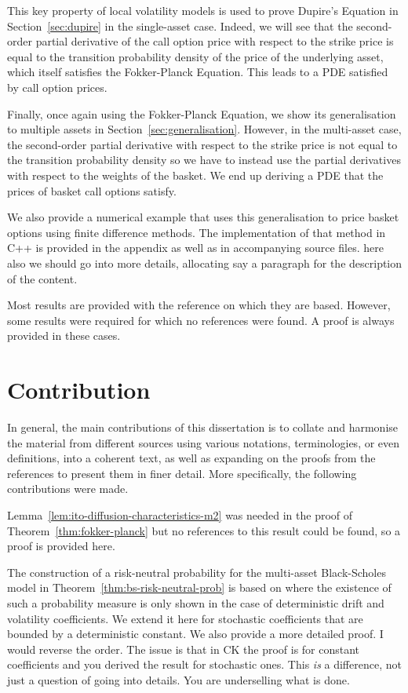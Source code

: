 \documentclass[english]{article}
\newcommand{\comment}[1]{\color{blue}#1\color{black}}
\numberwithin{equation}{section}
\numberwithin{figure}{section}
\theoremstyle{bolddescit}
\theoremstyle{definition}
\theoremstyle{definition}
\theoremstyle{plain}
\theoremstyle{plain}
\theoremstyle{bolddesc}
\theoremstyle{plain}
\theoremstyle{remark}
\begin{document}
This key property of local volatility models is used to prove Dupire's Equation in Section~\ref{sec:dupire} in the single-asset case. Indeed, we will see that the second-order partial derivative of the call option price with respect to the strike price is equal to the transition probability density of the price of the underlying asset, which itself satisfies the Fokker-Planck Equation. This leads to a PDE satisfied by call option prices.

Finally, once again using the Fokker-Planck Equation, we show its generalisation to multiple assets in Section~\ref{sec:generalisation}. However, in the multi-asset case, the second-order partial derivative with respect to the strike price is not equal to the transition probability density so we have to instead use the partial derivatives with respect to the weights of the basket. We end up deriving a PDE that the prices of basket call options satisfy.

We also provide a numerical example that uses this generalisation to price basket options using finite difference methods.  The implementation of that method in C++ is provided in the appendix as well as in accompanying source files.
\comment{here also we should go into more details, allocating say a paragraph for the description of the content.}

Most results are provided with the reference on which they are based. However, some results were required for which no references were found. A proof is always provided in these cases.

\section{Contribution}

In general, the main contributions of this dissertation is to collate and harmonise the material from different sources using various notations, terminologies, or even definitions, into a coherent text, as well as expanding on the proofs from the references to present them in finer detail. More specifically, the following contributions were made.

Lemma~\ref{lem:ito-diffusion-characteristics-m2} was needed in the proof of Theorem~\ref{thm:fokker-planck} but no references to this result could be found, so a proof is provided here.

The construction of a risk-neutral probability for the multi-asset Black-Scholes model in Theorem~\ref{thm:bs-risk-neutral-prob} is based on \textcite{capinski_blackscholes_2012} where the existence of such a probability measure is only shown in the case of deterministic drift and volatility coefficients. We extend it here for stochastic coefficients that are bounded by a deterministic constant. We also provide a more detailed proof.
\comment{I would reverse the order. The issue is that in CK the proof is for constant coefficients and you derived the result for stochastic ones. This {\em is} a difference, not just a question of going into details. You are underselling what is done.}
\end{document}
